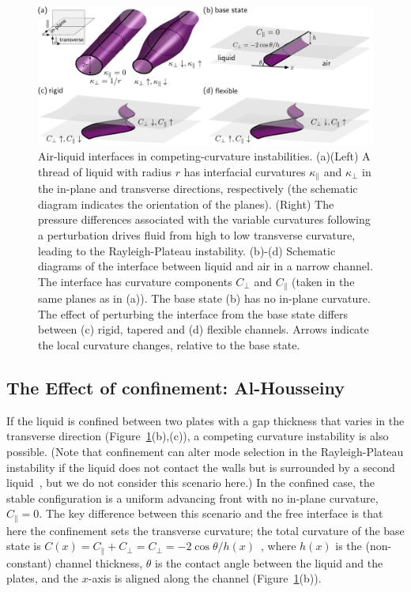 \begin{figure}[t]
\centering
\includegraphics[width = \textwidth]{mechanism_png_subfigs}
\caption{Air-liquid interfaces in competing-curvature instabilities. (a)(Left) A thread of liquid with radius $r$ has interfacial curvatures $\kappa_{\parallel}$ and $\kappa_{\perp}$ in the in-plane and transverse directions, respectively (the schematic diagram indicates the orientation of the planes).  (Right) The pressure differences associated with the variable curvatures following a perturbation drives fluid from high to low transverse curvature, leading to the Rayleigh-Plateau instability. (b)-(d) Schematic diagrams of the interface between liquid and air in a narrow channel. The interface has curvature components $C_{\perp}$ and $C_{\parallel}$ (taken in the same planes as in (a)). The base state (b) has no in-plane curvature. The effect of perturbing the interface from the base state differs between (c) rigid, tapered and (d) flexible channels. Arrows indicate the local curvature changes, relative to the base state.}
\label{fig:InstabilityChapter:Mechanism:Mechanism}
\end{figure}


\subsection{The Effect of confinement: Al-Housseiny}
If the liquid is confined between two plates with a gap thickness that varies in the transverse direction (Figure~\ref{fig:InstabilityChapter:Mechanism:Mechanism}(b),(c)), a competing curvature instability is also possible.  (Note that confinement can alter mode selection in the Rayleigh-Plateau instability if the liquid does not contact the walls but is surrounded by a second liquid~\citep{Son2003Macromolecules}, but we do not consider this scenario here.) In the confined case, the stable configuration is a uniform advancing front with no in-plane curvature, $C_{\parallel} = 0$. The key difference between this scenario and the free interface is that here the confinement sets the transverse curvature; the total curvature of the base state is  $C(x) = C_{\parallel}  + C_{\perp} =  C_{\perp} = -2 \cos \theta/h(x)$~\citep{deGennes2004}, where $h(x)$ is the (non-constant) channel thickness, $\theta$ is the contact angle between the liquid and the plates, and the $x$-axis is aligned along the channel  (Figure~\ref{fig:InstabilityChapter:Mechanism:Mechanism}(b)).

